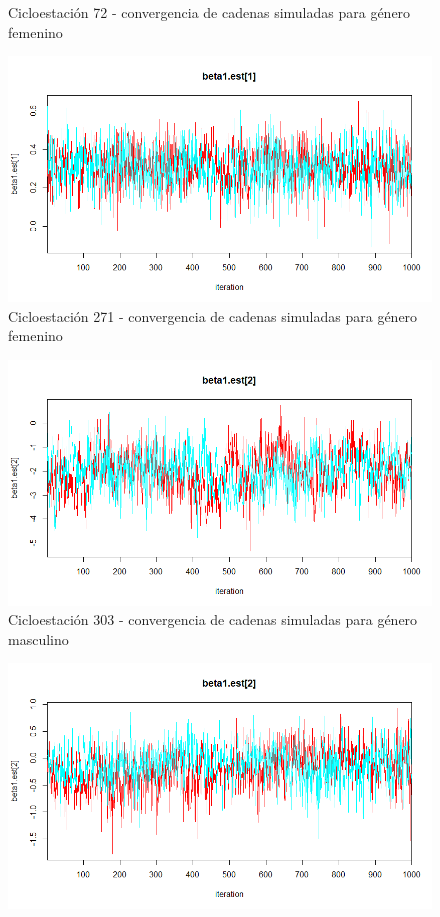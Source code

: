 \documentclass[9pt,twocolumn,twoside]{ilcss}
\begin{document}
\begin{appendices}
\begin{figure}[tbhp]
	\caption{ Cicloestación 72 - convergencia de cadenas simuladas para género femenino}
	\label{fig:72_cadenas_femenino}
\end{figure}
\begin{figure}[tbhp]
	\centering
	\includegraphics[width=0.9\linewidth]{Paper/images/271_cadenas_genero_1mujer.png}
	\caption{ Cicloestación 271 - convergencia de cadenas simuladas para género femenino}
	\label{fig:271_cadenas_femenino}
\end{figure}
\begin{figure}[tbhp]
	\centering
	\includegraphics[width=0.9\linewidth]{Paper/images/303_cadenas_genero_2hombre.png}
	\caption{ Cicloestación 303 - convergencia de cadenas simuladas para género masculino}
	\label{fig:303_cadenas_masculino}
\end{figure}
\begin{figure}[tbhp]
	\centering
	\includegraphics[width=0.9\linewidth]{Paper/images/72_cadenas_genero_2hombre.png}

\end{figure}
\end{appendices}
\end{document}
